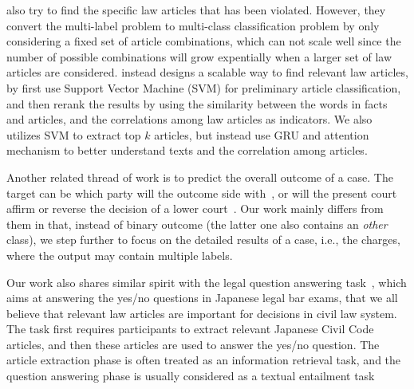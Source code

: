 \cite{liu2005classifying,liu2006exploring} also try to find the specific law articles that has been violated. However, they convert the multi-label problem to multi-class classification problem by only considering a fixed set of article combinations, which can not scale well since the number of possible combinations will grow expentially when a larger set of law articles are considered.
\cite{liu2015predicting} instead designs a scalable way to find relevant law articles, 
by first use Support Vector Machine (SVM) for preliminary article classification, and then 
rerank the results by using the similarity between the words in facts and articles, and the correlations among law articles as indicators.
We also utilizes SVM to extract top $k$ articles, but instead use GRU and attention mechanism to better understand texts and the correlation among articles.

Another related thread of work is to predict the overall outcome of a case. The target can be which party will the outcome side with~\cite{aletras2016predicting}, or will the present court affirm or reverse the decision of a lower court~\cite{katz2016general}. Our work mainly differs from them in that, instead of binary outcome (the latter one also contains an \emph{other} class), we step further to focus on the detailed results of a case, i.e., the charges, where the output may contain multiple labels. 



Our work also shares similar spirit with the legal question answering task~\cite{COLIEE14}, which aims at answering the yes/no questions in Japanese legal bar exams, that we all believe that relevant law articles are important for decisions in civil law system. 
The task first requires participants to extract relevant Japanese Civil Code articles, and then these articles are used to answer the yes/no question. 
The article extraction phase is often treated as an information retrieval task, and the question answering phase is usually considered as a textual entailment task~\cite{kim2014legal,kimconvolutional}
